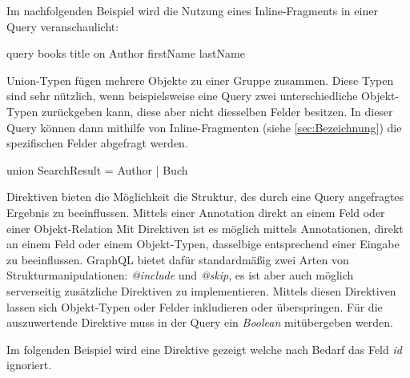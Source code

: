 Im nachfolgenden Beispiel wird die Nutzung eines Inline-Fragments in einer Query veranschaulicht:
\begin{JsCode}
query{
    books{
        title
        on Author{
            firstName
            lastName
        }
    }
}
\end{JsCode}

Union-Typen fügen mehrere Objekte zu einer Gruppe zusammen.
Diese Typen sind sehr nützlich, wenn beispielsweise eine Query zwei unterschiedliche Objekt-Typen zurückgeben kann, diese aber nicht diesselben Felder besitzen.
In dieser Query können dann mithilfe von Inline-Fragmenten (siehe \ref{sec:Bezeichnung}) die spezifischen Felder abgefragt werden.

\begin{JsCode}
union SearchResult = Author | Buch
\end{JsCode}

Direktiven bieten die Möglichkeit die Struktur, des durch eine Query angefragtes Ergebnis zu beeinflussen.
Mittels einer Annotation direkt an einem Feld oder einer Objekt-Relation
Mit Direktiven ist es möglich mittels Annotationen, direkt an einem Feld oder einem Objekt-Typen, dasselbige entsprechend einer Eingabe zu beeinflussen.
GraphQL bietet dafür standardmäßig zwei Arten von Strukturmanipulationen: \textit{@include} und \textit{@skip}, es ist aber auch möglich serverseitig zusätzliche Direktiven zu implementieren.
Mittels diesen Direktiven lassen sich Objekt-Typen oder Felder inkludieren oder überspringen.
Für die auszuwertende Direktive muss in der Query ein \textit{Boolean} mitübergeben werden.

Im folgenden Beispiel wird eine Direktive gezeigt welche nach Bedarf das Feld \textit{id} ignoriert.



